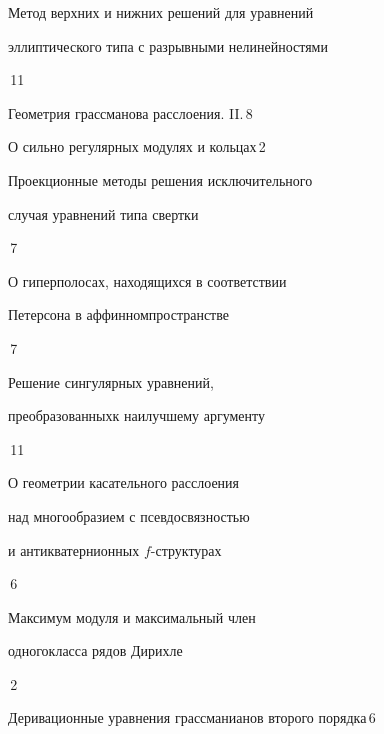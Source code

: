 

{Метод верхних и нижних решений для уравнений\newline


эллиптического типа с разрывными нелинейностями}{\No\,11}




{Геометрия грассманова расслоения. II.}{\No\,8}




{О сильно регулярных модулях и кольцах}{\No\,2}




{Проекционные методы решения исключительного\newline


случая уравнений типа свертки}{\No\,7}




{О гиперполосах, находящихся в соответствии


Петерсона в аффинном\newline пространстве}{\No\,7}








{Решение сингулярных уравнений, 


преобразованных\newline к наилучшему аргументу}{\No\,11}




{О геометрии касательного расслоения


над многообразием с псевдосвязностью\newline


и антикватернионных $f$-структурах}{\No\,6}






{Максимум модуля и максимальный член


одного\newline класса рядов Дирихле}{\No\,2}




{Деривационные уравнения грассманианов второго порядка}{\No\,6}


